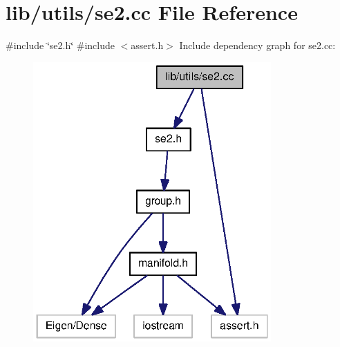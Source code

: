 \section{lib/utils/se2.cc \-File \-Reference}
\label{se2_8cc}
{\ttfamily \#include \char`\"{}se2.\-h\char`\"{}}\*
{\ttfamily \#include $<$assert.\-h$>$}\*
\-Include dependency graph for se2.\-cc\-:
\nopagebreak
\begin{figure}[H]
\begin{center}
\leavevmode
\includegraphics[width=258pt]{se2_8cc__incl}
\end{center}
\end{figure}
